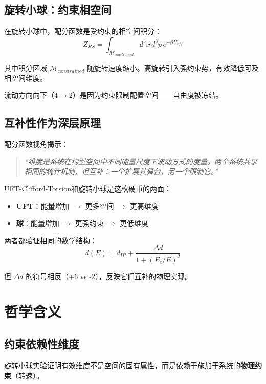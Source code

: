 \documentclass[12pt,a4paper]{article}
\begin{document}
\subsection{旋转小球：约束相空间}

在旋转小球中，配分函数是受约束的相空间积分：
\begin{equation}
    Z_{RS} = \int_{\mathcal{M}_{constrained}} d^3x \, d^3p \, e^{-\beta H_{eff}}
\end{equation}

其中积分区域 $\mathcal{M}_{constrained}$ 随旋转速度缩小。高旋转引入强约束势，有效降低可及相空间维度。

流动方向向下（$4 \to 2$）是因为约束限制配置空间——自由度被冻结。

\subsection{互补性作为深层原理}

配分函数视角揭示：

\begin{quote}
    \textit{``维度是系统在构型空间中不同能量尺度下波动方式的度量。两个系统共享相同的统计机制，但互补：一个扩展其舞台，另一个限制它。''}
\end{quote}

UFT-Clifford-Torsion和旋转小球是这枚硬币的两面：
\begin{itemize}
    \item \textbf{UFT}：能量增加 $\rightarrow$ 更多空间 $\rightarrow$ 更高维度
    \item \textbf{球}：能量增加 $\rightarrow$ 更强约束 $\rightarrow$ 更低维度
\end{itemize}

两者都验证相同的数学结构：
\begin{equation}
    d(E) = d_{IR} + \frac{\Delta d}{1+(E_c/E)^2}
\end{equation}

但 $\Delta d$ 的符号相反（+6 vs -2），反映它们互补的物理实现。

\section{哲学含义}
\label{sec:philosophy}

\subsection{约束依赖性维度}

旋转小球实验证明有效维度不是空间的固有属性，而是依赖于施加于系统的\textbf{物理约束}（转速）。
\end{document}
